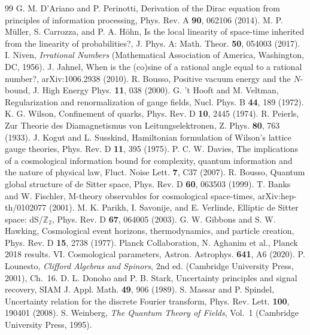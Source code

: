 \documentclass[aps,prd,twocolumn,superscriptaddress,nofootinbib]{revtex4-2}
\begin{document}
\begin{thebibliography}{99}
 G. M. D'Ariano and P. Perinotti, Derivation of the Dirac equation from principles of information processing, Phys. Rev. A \textbf{90}, 062106 (2014).
 M. P. M\"uller, S. Carrozza, and P. A. H\"ohn, Is the local linearity of space-time inherited from the linearity of probabilities?, J. Phys. A: Math. Theor. \textbf{50}, 054003 (2017).
 I. Niven, \emph{Irrational Numbers} (Mathematical Association of America, Washington, DC, 1956).
 J. Jahnel, When is the (co)sine of a rational angle equal to a rational number?, arXiv:1006.2938 (2010).
 R. Bousso, Positive vacuum energy and the $N$-bound, J. High Energy Phys. \textbf{11}, 038 (2000).
 G. 't Hooft and M. Veltman, Regularization and renormalization of gauge fields, Nucl. Phys. B \textbf{44}, 189 (1972).
 K. G. Wilson, Confinement of quarks, Phys. Rev. D \textbf{10}, 2445 (1974).
 R. Peierls, Zur Theorie des Diamagnetismus von Leitungselektronen, Z. Phys. \textbf{80}, 763 (1933).
 J. Kogut and L. Susskind, Hamiltonian formulation of Wilson's lattice gauge theories, Phys. Rev. D \textbf{11}, 395 (1975).
 P. C. W. Davies, The implications of a cosmological information bound for complexity, quantum information and the nature of physical law, Fluct. Noise Lett. \textbf{7}, C37 (2007).
 R. Bousso, Quantum global structure of de Sitter space, Phys. Rev. D \textbf{60}, 063503 (1999).
 T. Banks and W. Fischler, M-theory observables for cosmological space-times, arXiv:hep-th/0102077 (2001).
 M. K. Parikh, I. Savonije, and E. Verlinde, Elliptic de Sitter space: dS/$\mathbb{Z}_2$, Phys. Rev. D \textbf{67}, 064005 (2003).
 G. W. Gibbons and S. W. Hawking, Cosmological event horizons, thermodynamics, and particle creation, Phys. Rev. D \textbf{15}, 2738 (1977).
 Planck Collaboration, N. Aghanim et al., Planck 2018 results. VI. Cosmological parameters, Astron. Astrophys. \textbf{641}, A6 (2020).
 P. Lounesto, \emph{Clifford Algebras and Spinors}, 2nd ed. (Cambridge University Press, 2001), Ch.~16.
 D. L. Donoho and P. B. Stark, Uncertainty principles and signal recovery, SIAM J. Appl. Math. \textbf{49}, 906 (1989).
 S. Massar and P. Spindel, Uncertainty relation for the discrete Fourier transform, Phys. Rev. Lett. \textbf{100}, 190401 (2008).
 S. Weinberg, \emph{The Quantum Theory of Fields}, Vol.~1 (Cambridge University Press, 1995).
\end{thebibliography}
\end{document}
